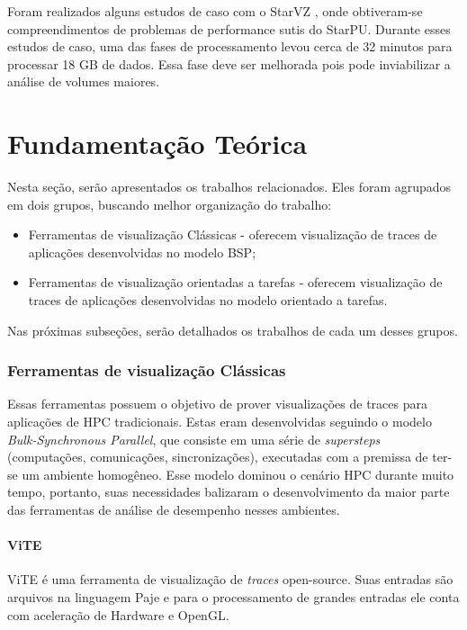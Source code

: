 \documentclass[prop-esp]{iiufrgs}
\begin{document}
Foram realizados alguns estudos de caso com o StarVZ \cite{ref:starvz}, onde obtiveram-se compreendimentos de problemas de performance sutis do StarPU. Durante esses estudos de caso, uma das fases de processamento levou cerca de 32 minutos para processar 18 GB de dados. Essa fase deve ser melhorada pois pode inviabilizar a análise de volumes maiores.


%
\chapter{Fundamentação Teórica}

Nesta seção, serão apresentados os trabalhos relacionados. Eles foram agrupados em dois grupos, buscando melhor organização do trabalho:

\begin{itemize}
\item Ferramentas de visualização Clássicas - oferecem visualização de traces de aplicações desenvolvidas no modelo BSP;
\item Ferramentas de visualização orientadas a tarefas - oferecem visualização de traces de aplicações desenvolvidas no modelo orientado a tarefas.
\end{itemize}

Nas próximas subseções, serão detalhados os trabalhos de cada um desses grupos.

\subsection*{Ferramentas de visualização Clássicas}

Essas ferramentas possuem o objetivo de prover visualizações de traces para aplicações de HPC tradicionais. Estas eram desenvolvidas
seguindo o modelo \emph{Bulk-Synchronous Parallel}, que consiste em uma série de \emph{supersteps} (computações, comunicações, sincronizações), 
executadas com a premissa de ter-se um ambiente homogêneo. Esse modelo dominou o cenário HPC durante muito tempo, portanto, suas necessidades
balizaram o desenvolvimento da maior parte das ferramentas de análise de desempenho nesses ambientes.

\subsubsection*{ViTE}
ViTE \cite{ref:vite} é uma ferramenta de visualização de \emph{traces} open-source. Suas entradas são arquivos na linguagem Paje \cite{} e para o processamento
de grandes entradas ele conta com aceleração de Hardware e OpenGL.
\end{document}
